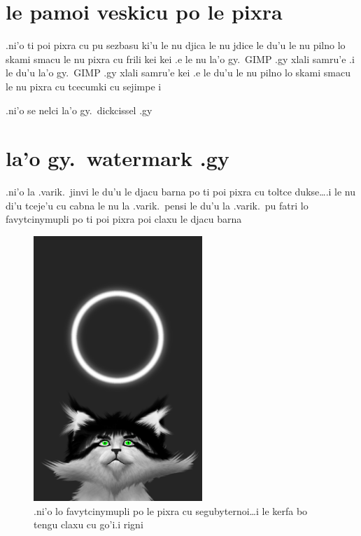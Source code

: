 \documentclass{report}
\begin{document}
\section{le pamoi veskicu po le pixra}
.ni'o ti poi pixra cu pu sezbasu ki'u le nu djica le nu jdice le du'u le nu pilno lo skami smacu le nu pixra cu frili kei kei .e le nu la'o gy.\ GIMP .gy xlali samru'e \@ .i le du'u la'o gy.\ GIMP .gy xlali samru'e kei .e le du'u le nu pilno lo skami smacu le nu pixra cu tcecumki cu sejimpe                                                     i

.ni'o se nelci la'o gy.\ dickcissel .gy
\section{la'o gy.\ watermark .gy}
.ni'o la .varik.\ jinvi le du'u le djacu barna po ti poi pixra cu toltce dukse\ldots\@ .i le nu di'u tceje'u cu cabna le nu la .varik.\ pensi le du'u la .varik.\ pu fatri lo favytcinymupli po ti poi pixra poi claxu le djacu barna
\begin{figure}[ht]
	\centering
	\includegraphics[height=10cm]{20200414042645-03/20200414042645-03-uw.png}
	\caption[center]{.ni'o lo favytcinymupli po le pixra cu segubyternoi\ldots i le kerfa bo tengu claxu cu go'i\@  .i rigni}
\end{figure}
\end{document}
